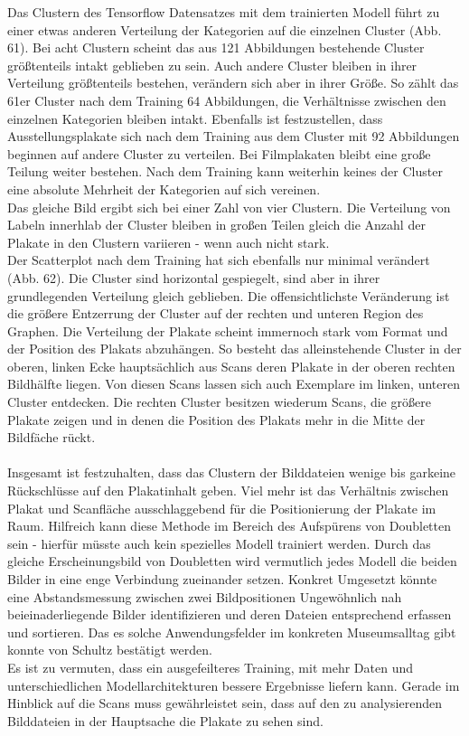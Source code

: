 \documentclass[a4paper,12pt,ngerman]{article}
\begin{document}
Das Clustern des Tensorflow Datensatzes mit dem trainierten Modell führt zu einer etwas anderen Verteilung der Kategorien auf die einzelnen Cluster (Abb. 61). Bei acht Clustern scheint das aus 121 Abbildungen bestehende Cluster größtenteils intakt geblieben zu sein. Auch andere Cluster bleiben in ihrer Verteilung größtenteils bestehen, verändern sich aber in ihrer Größe. So zählt das 61er Cluster nach dem Training 64 Abbildungen, die Verhältnisse zwischen den einzelnen Kategorien bleiben intakt. Ebenfalls ist festzustellen, dass Ausstellungsplakate sich nach dem Training aus dem Cluster mit 92 Abbildungen beginnen auf andere Cluster zu verteilen. Bei Filmplakaten bleibt eine große Teilung weiter bestehen. Nach dem Training kann weiterhin keines der Cluster eine absolute Mehrheit der Kategorien auf sich vereinen. \\
Das gleiche Bild ergibt sich bei einer Zahl von vier Clustern. Die Verteilung von Labeln innerhlab der Cluster bleiben in großen Teilen gleich die Anzahl der Plakate in den Clustern variieren - wenn auch nicht stark. \\
Der Scatterplot nach dem Training hat sich ebenfalls nur minimal verändert (Abb. 62). Die Cluster sind horizontal gespiegelt, sind aber in ihrer grundlegenden Verteilung gleich geblieben. Die offensichtlichste Veränderung ist die größere Entzerrung der Cluster auf der rechten und unteren Region des Graphen. Die Verteilung der Plakate scheint immernoch stark vom Format und der Position des Plakats abzuhängen. So besteht das alleinstehende Cluster in der oberen, linken Ecke hauptsächlich aus Scans deren Plakate in der oberen rechten Bildhälfte liegen. Von diesen Scans lassen sich auch Exemplare im linken, unteren Cluster entdecken. Die rechten Cluster besitzen wiederum Scans, die größere Plakate zeigen und in denen die Position des Plakats mehr in die Mitte der Bildfäche rückt. \\
\\
Insgesamt ist festzuhalten, dass das Clustern der Bilddateien wenige bis garkeine Rückschlüsse auf den Plakatinhalt geben. Viel mehr ist das Verhältnis zwischen Plakat und Scanfläche ausschlaggebend für die Positionierung der Plakate im Raum. Hilfreich kann diese Methode im Bereich des Aufspürens von Doubletten sein - hierfür müsste auch kein spezielles Modell trainiert werden. Durch das gleiche Erscheinungsbild von Doubletten wird vermutlich jedes Modell die beiden Bilder in eine enge Verbindung zueinander setzen. Konkret Umgesetzt könnte eine Abstandsmessung zwischen zwei Bildpositionen Ungewöhnlich nah beieinaderliegende Bilder identifizieren und deren Dateien entsprechend erfassen und sortieren. Das es solche Anwendungsfelder im konkreten Museumsalltag gibt konnte von Schultz bestätigt werden. \\
Es ist zu vermuten, dass ein ausgefeilteres Training, mit mehr Daten und unterschiedlichen Modellarchitekturen bessere Ergebnisse liefern kann. Gerade im Hinblick auf die Scans muss gewährleistet sein, dass auf den zu analysierenden Bilddateien in der Hauptsache die Plakate zu sehen sind. \\
\end{document}
